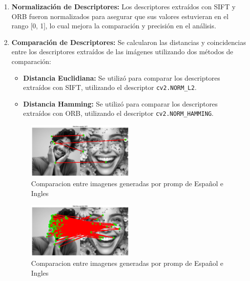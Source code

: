 \documentclass[unnumsec,webpdf,modern,large]{mam-authoring-template}
\theoremstyle{thmstyleone}%
\theoremstyle{thmstyletwo}%
\theoremstyle{thmstylethree}%
\begin{document}
\begin{enumerate}
    \item \textbf{Normalización de Descriptores:} Los descriptores extraídos con SIFT y ORB fueron normalizados para asegurar que sus valores estuvieran en el rango [0, 1], lo cual mejora la comparación y precisión en el análisis.

    \item \textbf{Comparación de Descriptores:} Se calcularon las distancias y coincidencias entre los descriptores extraídos de las imágenes utilizando dos métodos de comparación:
    \begin{itemize}
        \item \textbf{Distancia Euclidiana:} Se utilizó para comparar los descriptores extraídos con SIFT, utilizando el descriptor \texttt{cv2.NORM\_L2}.
        \item \textbf{Distancia Hamming:} Se utilizó para comparar los descriptores extraídos con ORB, utilizando el descriptor \texttt{cv2.NORM\_HAMMING}.
    \end{itemize}

    \begin{figure}[h]
    \centering
    \includegraphics[width=0.5\textwidth]{bing1.png}
    \caption{Comparacion entre imagenes generadas por promp de Español e Ingles}
    \label{fig:mesh1}
    \end{figure}

    \begin{figure}[h]
    \centering
    \includegraphics[width=0.5\textwidth]{bing2.png}
    \caption{Comparacion entre imagenes generadas por promp de Español e Ingles}
    \label{fig:mesh1}
    \end{figure}


\end{enumerate}
\end{document}
